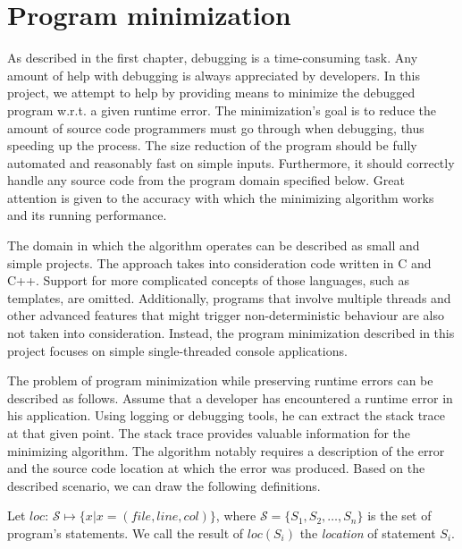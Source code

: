 \chapter{Program minimization}

As described in the first chapter, debugging is a time-consuming task.
Any amount of help with debugging is always appreciated by developers.
In this project, we attempt to help by providing means to minimize the 
debugged program w.r.t. a given runtime error.
The minimization's goal is to reduce the amount of source code programmers 
must go through when debugging, thus speeding up the process.
The size reduction of the program should be fully automated and reasonably 
fast on simple inputs.
Furthermore, it should correctly handle any source code from the program 
domain specified below.
Great attention is given to the accuracy with which the minimizing algorithm 
works and its running performance.


The domain in which the algorithm operates can be described as small and 
simple projects.
The approach takes into consideration code written in C and C++.
Support for more complicated concepts of those languages, such as templates,
are omitted.
Additionally, programs that involve multiple threads and other advanced
features that might trigger non-deterministic behaviour are also not taken 
into consideration.
Instead, the program minimization described in this project focuses 
on simple single-threaded console applications.

The problem of program minimization while preserving runtime errors can be 
described as follows.
Assume that a developer has encountered a runtime error in his application.
Using logging or debugging tools, he can extract the stack trace at that 
given point.
The stack trace provides valuable information for the minimizing algorithm.
The algorithm notably requires a description of the error and the source code 
location at which the error was produced.
Based on the described scenario, we can draw the following definitions.

\begin{defn}[Location]\label{def04:1}
  Let $loc$: $\mathcal{S} \mapsto \{x | x = (file, line, col)\}$, 
  where $\mathcal{S} = \{S_1, S_2, \ldots, S_n\}$ 
  is the set of program's statements.
  We call the result of $loc(S_i)$ the \emph{location} of statement $S_i$.
\end{defn}

